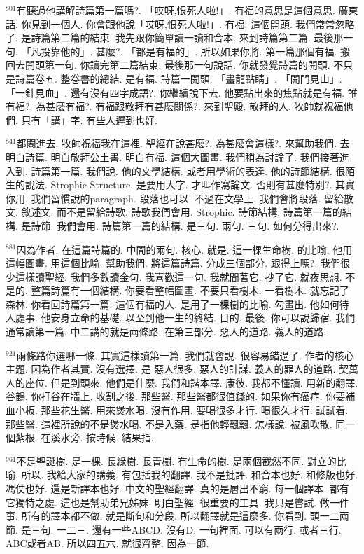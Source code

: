 \documentclass{book}
\begin{document}
$^{801}$有聽過他講解詩篇第一篇嗎?.
「哎呀,恨死人啦!」.
有福的意思是這個意思.
廣東話.
你見到一個人.
你會跟他說「哎呀,恨死人啦!」.
有福.
這個開頭.
我們常常忽略了.
是詩篇第二篇的結束.
我先跟你簡單讀一讀和合本.
來到詩篇第二篇.
最後那一句.
「凡投靠他的」.
甚麼?.
「都是有福的」.
所以如果你將.
第一篇那個有福.
搬回去開頭第一句.
你讀完第二篇結束.
最後那一句說話.
你就發覺詩篇的開頭.
不只是詩篇卷五.
整卷書的總結.
是有福.
詩篇一開頭.
「畫龍點睛」.
「開門見山」.
「一針見血」.
還有沒有四字成語?.
你繼續說下去.
他要點出來的焦點就是有福.
誰有福?.
為甚麼有福?.
有福跟敬拜有甚麼關係?.
來到聖殿.
敬拜的人.
牧師就祝福他們.
只有「講」字.
有些人遲到也好.

$^{841}$都閹進去.
牧師祝福我在這裡.
聖經在說甚麼?.
為甚麼會這樣?.
來幫助我們.
去明白詩篇.
明白敬拜公土書.
明白有福.
這個大圖畫.
我們稍為討論了.
我們接著進入到.
詩篇第一篇.
我們說.
他的文學結構.
或者用學術的表達.
他的詩節結構.
很陌生的說法.
Strophic Structure.
是要用大字.
才叫作寫論文.
否則有甚麼特別?.
其實你用.
我們習慣說的paragraph.
段落也可以.
不過在文學上.
我們會將段落.
留給散文.
敘述文.
而不是留給詩歌.
詩歌我們會用.
Strophic.
詩節結構.
詩篇第一篇的結構.
是詩節.
我們會用.
詩篇第一篇的結構.
是三句.
兩句.
三句.
如何分得出來?.

$^{881}$因為作者.
在這篇詩篇的.
中間的兩句.
核心.
就是.
這一棵生命樹.
的比喻.
他用這幅圖畫.
用這個比喻.
幫助我們.
將這篇詩篇.
分成三個部分.
跟得上嗎?.
我們很少這樣讀聖經.
我們多數讀金句.
我喜歡這一句.
我就間著它.
抄了它.
就夜思想.
不是的.
整篇詩篇有一個結構.
你要看整幅圖畫.
不要只看樹木.
一看樹木.
就忘記了森林.
你看回詩篇第一篇.
這個有福的人.
是用了一棵樹的比喻.
勾畫出.
他如何待人處事.
他安身立命的基礎.
以至到他一生的終結.
目的.
最後.
你可以說歸宿.
我們通常讀第一篇.
中二講的就是兩條路.
在第三部分.
惡人的道路.
義人的道路.

$^{921}$兩條路你選哪一條.
其實這樣讀第一篇.
我們就會說.
很容易錯過了.
作者的核心主題.
因為作者其實.
沒有選擇.
是 惡人很多.
惡人的計謀.
義人的罪人的道路.
契萬人的座位.
但是到頭來.
他們是什麼.
我們和諧本譯.
康彼.
我都不懂讀.
用新的翻譯.
谷鶴.
你打谷在牆上.
收割之後.
那些醫.
那些醫都很值錢的.
如果你有癌症.
你要補血小板.
那些花生醫.
用來煲水喝.
沒有作用.
要喝很多才行.
喝很久才行.
試試看.
那些醫.
這裡所說的不是煲水喝.
不是入藥.
是指他輕飄飄.
怎樣說.
被風吹散.
同一個紮根.
在溪水旁.
按時候.
結果指.

$^{961}$不是聖誕樹.
是一棵.
長綠樹.
長青樹.
有生命的樹.
是兩個截然不同.
對立的比喻.
所以.
我給大家的講義.
有包括我的翻譯.
我不是批評.
和合本也好.
和修版也好.
馮仗也好.
還是新譯本也好.
中文的聖經翻譯.
真的是層出不窮.
每一個譯本.
都有它獨特之處.
這也是幫助弟兄姊妹.
明白聖經.
很重要的工具.
我只是嘗試.
做一件事.
所有的譯本都不做.
就是斷句和分段.
所以翻譯就是這麼多.
你看到.
頭一二兩節.
是三句.
一二三.
還有一些ABCD.
沒有D.
一句裡面.
可以有兩行.
或者三行.
ABC或者AB.
所以四五六.
就很齊整.
因為一節.
\end{document}

